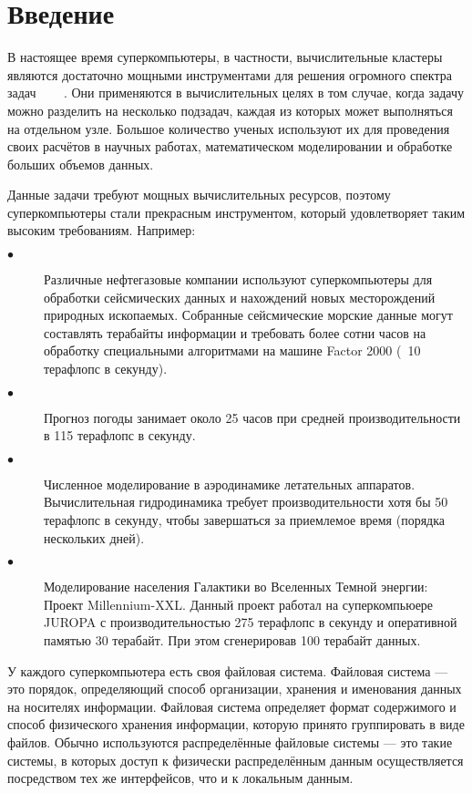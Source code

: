 \section{Введение}
\label{sec:Chapter0} 


В настоящее время суперкомпьютеры, в частности, вычислительные кластеры являются достаточно мощными
инструментами для решения огромного спектра задач ~\cite{Zheng2018InteractiveCO}
~\cite{hoefler2014overview}~\cite{bezrukov2018machine}.
Они применяются в вычислительных целях в том случае,
когда задачу можно разделить на несколько подзадач, каждая из которых может выполняться на отдельном узле.
Большое количество ученых используют их для проведения своих расчётов в научных работах, математическом
моделировании и обработке больших объемов данных.

Данные задачи требуют мощных вычислительных ресурсов,
поэтому суперкомпьютеры стали прекрасным инструментом, который удовлетворяет таким высоким требованиям.
Например:
\begin{description}
    \item[$\bullet$] Различные нефтегазовые компании используют суперкомпьютеры для обработки
    сейсмических данных и нахождений новых месторождений природных ископаемых. Собранные сейсмические морские данные могут составлять терабайты информации и требовать более сотни часов на обработку специальными алгоритмами на машине Factor 2000 (~10 терафлопс в секунду). ~\cite{Meuer2013SupercomputersP}
    \item[$\bullet$] Прогноз погоды занимает около 25 часов при средней производительности в 115
    терафлопс в секунду.~\cite{Open_Forecast_HPC_Model_M04} 
    \item[$\bullet$] Численное моделирование в аэродинамике летательных аппаратов. Вычислительная
    гидродинамика требует производительности хотя бы 50 терафлопс в секунду, чтобы завершаться за
    приемлемое время (порядка нескольких дней).  ~\cite{Meuer2013SupercomputersP}
    \item[$\bullet$] Моделирование населения Галактики во Вселенных Темной энергии: Проект
    Millennium-XXL. Данный проект работал на суперкомпьюере JUROPA с производительностью 275 терафлопс в
    секунду и оперативной памятью 30 терабайт. При этом сгенерировав 100 терабайт данных.  
    ~\cite{Open_Forecast_HPC_Model_M04} 
\end{description}



У каждого суперкомпьютера есть своя файловая система. Файловая система --- это порядок, определяющий
способ организации, хранения и именования данных на носителях информации. Файловая система определяет
формат содержимого и способ физического хранения информации, которую принято группировать в виде файлов.
Обычно используются распределённые файловые системы --- это такие системы, в которых доступ к физически
распределённым данным осуществляется посредством тех же интерфейсов, что и к локальным данным.


